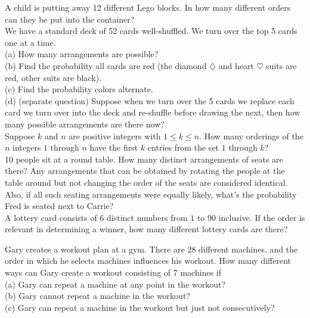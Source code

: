 \documentclass[12pt]{article}
\begin{document}
 A child is putting away 12 different Lego blocks. In how many different orders can they be put into the container?\\



 We have a standard deck of 52 cards well-shuffled.  We turn over the top 5 cards one at a time.\\
(a) How many arrangements are possible?\\
(b) Find the probability all cards are red (the diamond $\diamondsuit$ and heart $\heartsuit$ suits are red, other suits are black).\\
(c) Find the probability colors alternate.\\
(d) (separate question) Suppose when we turn over the 5 cards we replace each card we turn over into the deck and re-shuffle before drawing the next, then how many possible arrangements are there now? \\

 Suppose $k$ and $n$ are positive integers with $1\le k\le n$.
How many orderings of the $n$ integers $1$ through $n$ have the first $k$ entries from the set $1$ through $k$?\\



 10 people sit at a round table. How many distinct arrangements of seats are there? Any arrangements that can be obtained by rotating the people at the table around but not changing the order of the seats are considered identical. Also, if all such seating arrangements were equally likely, what's the probability Fred is seated next to Carrie?\\

 A lottery card consists of 6 distinct numbers from $1$ to $90$ inclusive.
If the order is relevant in determining a winner, how many different lottery cards are there?\\


\newpage



 Gary creates a workout plan at a gym. There are 28 different machines, and the order in which he selects machines influences his workout.
How many different ways can Gary create a workout consisting of 7 machines if \\
(a) Gary can repeat a machine at any point in the workout?\\
(b) Gary cannot repeat a machine in the workout?\\
(c) Gary can repeat a machine in the workout but just not consecutively?\\
\end{document}
